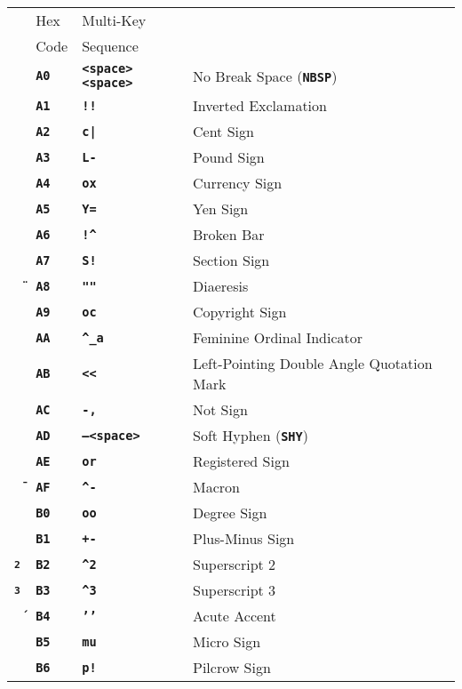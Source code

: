 \documentclass[12pt]{article}
\makeatletter
\newcommand{\TT}[1]{{\tt \bfseries #1}}
\newcommand{\ttkey}[1]{\TT{#1}\index{#1@{\tt #1}}}
\newlength{\figurewidth}
\newenvironment{boxedfigure}[1][!btp]%
	{\begin{figure*}[#1]
	 \begin{lrbox}{\figurebox}
	 \begin{minipage}{\figurewidth}

	 \vspace*{1ex}}%
	{
	 \vspace*{1ex}

	 \end{minipage}
	 \end{lrbox}

	 \centering
	 \fbox{\hspace*{0.1in}\usebox{\figurebox}\hspace*{0.1in}}
	 \end{figure*}}
\makeatother
\begin{document}
\begin{boxedfigure}[p]
\begin{tabular}{llll}
& Hex & Multi-Key \\
& Code & Sequence
\\[1ex]
\TT{~}
  & \TT{A0} & \TT{<space><space>} & No Break Space (\ttkey{NBSP}) \\
\TT{\textexclamdown}
  & \TT{A1} & \TT{!!} & Inverted Exclamation \\
\TT{\textcent}
  & \TT{A2} & \TT{c|} & Cent Sign \\
\TT{\textsterling}
  & \TT{A3} & \TT{L-} & Pound Sign \\
\TT{\textcurrency}
  & \TT{A4} & \TT{ox} & Currency Sign \\
\TT{\textyen}
  & \TT{A5} & \TT{Y=} & Yen Sign \\
\TT{\textbrokenbar}
  & \TT{A6} & \TT{!\textasciicircum} & Broken Bar \\
\TT{\textsection}
  & \TT{A7} & \TT{S!} & Section Sign \\
\TT{\"{~}}
  & \TT{A8} & \TT{""} & Diaeresis \\
\TT{\textcopyright}
  & \TT{A9} & \TT{oc} & Copyright Sign \\
\TT{\textordfeminine}
  & \TT{AA} & \TT{\textasciicircum\_a} & Feminine Ordinal Indicator \\
\TT{\guillemotleft}
  & \TT{AB} & \TT{<{}<} & Left-Pointing Double Angle Quotation Mark \\
\TT{\textlnot}
  & \TT{AC} & \TT{-,} & Not Sign \\
\TT{~}
  & \TT{AD} & \TT{--<space>} & Soft Hyphen (\TT{SHY}) \\
\TT{\textregistered}
  & \TT{AE} & \TT{or} & Registered Sign \\
\TT{\={~}}
  & \TT{AF} & \TT{\textasciicircum-} & Macron \\
\TT{\textdegree}
  & \TT{B0} & \TT{oo} & Degree Sign \\
\TT{\textpm}
  & \TT{B1} & \TT{+-} & Plus-Minus Sign \\
\TT{\textsuperscript{2}}
  & \TT{B2} & \TT{\textasciicircum2} & Superscript 2 \\
\TT{\textsuperscript{3}}
  & \TT{B3} & \TT{\textasciicircum3} & Superscript 3 \\
\TT{\'{~}}
  & \TT{B4} & \TT{'{}'} & Acute Accent \\
\TT{\textmu}
  & \TT{B5} & \TT{mu} & Micro Sign \\
\TT{\textpilcrow}
  & \TT{B6} & \TT{p!} & Pilcrow Sign \\

\end{tabular}
\end{boxedfigure}
\end{document}
